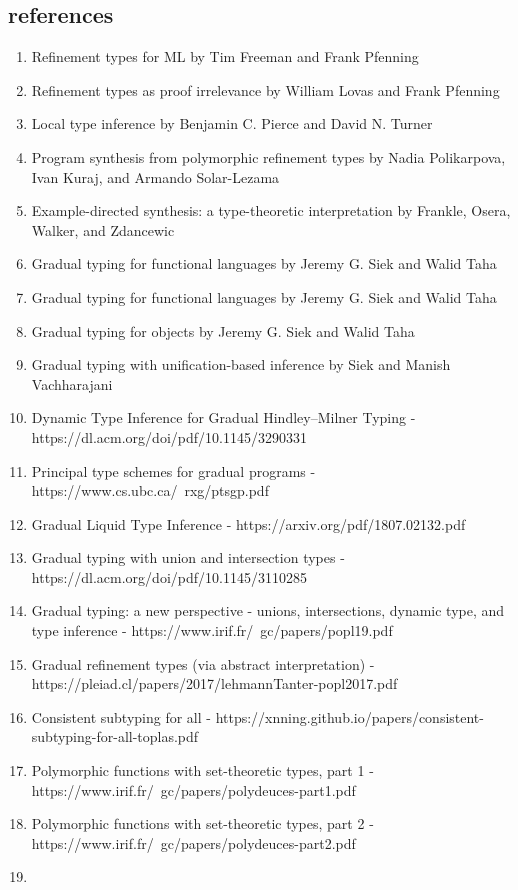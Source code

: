 \documentclass[sigplan,screen]{acmart}
\begin{document}
\subsection*{references}
\begin{enumerate}
\item Refinement types for ML by Tim Freeman and Frank Pfenning 
\item Refinement types as proof irrelevance by William Lovas and Frank Pfenning 
\item Local type inference by Benjamin C. Pierce and David N. Turner
\item Program synthesis from polymorphic refinement types by Nadia Polikarpova, Ivan Kuraj, and Armando Solar-Lezama
\item Example-directed synthesis: a type-theoretic interpretation by Frankle, Osera, Walker, and Zdancewic
\item Gradual typing for functional languages by Jeremy G. Siek and Walid Taha 
\item Gradual typing for functional languages by Jeremy G. Siek and Walid Taha 
\item Gradual typing for objects by Jeremy G. Siek and Walid Taha 
\item Gradual typing with unification-based inference by Siek and Manish Vachharajani 
\item Dynamic Type Inference for Gradual Hindley–Milner Typing - https://dl.acm.org/doi/pdf/10.1145/3290331
\item Principal type schemes for gradual programs - https://www.cs.ubc.ca/~rxg/ptsgp.pdf
\item Gradual Liquid Type Inference - https://arxiv.org/pdf/1807.02132.pdf
\item Gradual typing with union and intersection types - https://dl.acm.org/doi/pdf/10.1145/3110285
\item Gradual typing: a new perspective - unions, intersections, dynamic type, and type inference - https://www.irif.fr/~gc/papers/popl19.pdf
\item Gradual refinement types (via abstract interpretation) - https://pleiad.cl/papers/2017/lehmannTanter-popl2017.pdf
\item Consistent subtyping for all - https://xnning.github.io/papers/consistent-subtyping-for-all-toplas.pdf
\item Polymorphic functions with set-theoretic types, part 1 - https://www.irif.fr/~gc/papers/polydeuces-part1.pdf
\item Polymorphic functions with set-theoretic types, part 2 - https://www.irif.fr/~gc/papers/polydeuces-part2.pdf
\item 


\end{enumerate}
\end{document}
